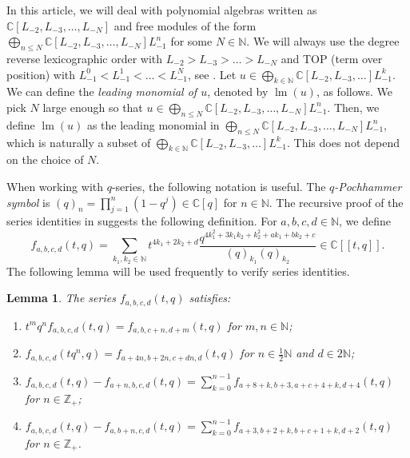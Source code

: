 \documentclass[a4paper, 12pt, reqno]{amsart}
\newtheorem{lemma}[theorem]{Lemma}
\theoremstyle{remark}
\DeclareMathOperator{\lm}{lm}
\begin{document}
In this article, we will deal with polynomial algebras written as $\mathbb{C}[L_{-2}, L_{-3}, \dots, L_{-N}]$ and free modules of the form $\bigoplus_{n \le N}\mathbb{C}[L_{-2}, L_{-3}, \dots, L_{-N}]L_{-1}^n$ for some $N \in \mathbb{N}$.
We will always use the degree reverse lexicographic order with $L_{-2} > L_{-3} > \dots > L_{-N}$ and TOP (term over position) with $L_{-1}^0 < L_{-1}^1 < \dots < L_{-1}^N$, see \cite[\S3.5]{adams_introduction_1994}.
Let $u \in \bigoplus_{k \in \mathbb{N}}\mathbb{C}[L_{-2}, L_{-3}, \dots]L_{-1}^k$.
We can define the \emph{leading monomial of $u$}, denoted by $\lm(u)$, as follows.
We pick $N$ large enough so that $u \in \bigoplus_{n \le N}\mathbb{C}[L_{-2}, L_{-3}, \dots, L_{-N}]L_{-1}^n$.
Then, we define $\lm(u)$ as the leading monomial in $\bigoplus_{n \le N}\mathbb{C}[L_{-2}, L_{-3}, \dots, L_{-N}]L_{-1}^n$, which is naturally a subset of $\bigoplus_{k \in \mathbb{N}}\mathbb{C}[L_{-2}, L_{-3}, \dots]L_{-1}^k$.
This does not depend on the choice of $N$.

When working with $q$-series, the following notation is useful.
The \emph{$q$-Pochhammer symbol} is $(q)_n = \prod_{j = 1}^n(1 - q^j) \in \mathbb{C}[q]$ for $n \in \mathbb{N}$.
The recursive proof of the series identities in \cite{andrews_singular_2022} suggests the following definition.
For $a, b, c, d \in \mathbb{N}$, we define
\begin{equation*}
  f_{a, b, c, d}(t, q) = \sum_{k_1, k_2 \in \mathbb{N}}t^{4k_1 + 2k_2 + d}\frac{q^{4k_1^2 + 3k_1k_2 + k_2^2 + ak_1 + bk_2 + c}}{(q)_{k_1}(q)_{k_2}} \in \mathbb{C}[[t, q]].
\end{equation*}
The following lemma will be used frequently to verify series identities.

\begin{lemma}
  \label{lmm:1}
  The series $f_{a, b, c, d}(t, q)$ satisfies:
  \begin{enumerate}
  \item $t^mq^nf_{a, b, c, d}(t, q) = f_{a, b, c + n, d + m}(t, q)$ for $m, n \in \mathbb{N}$;
  \item $f_{a, b, c, d}(tq^n, q) = f_{a + 4n, b + 2n, c + dn, d}(t, q)$ for $n \in \frac{1}{2}\mathbb{N}$ and $d \in 2\mathbb{N}$;
  \item $f_{a, b, c, d}(t, q) - f_{a + n, b, c, d}(t, q) = \sum_{k = 0}^{n - 1}f_{a + 8 + k, b + 3, a + c + 4 + k, d + 4}(t, q)$ for $n \in \mathbb{Z}_+$;
  \item $f_{a, b, c, d}(t, q) - f_{a, b + n, c, d}(t, q) = \sum_{k = 0}^{n - 1}f_{a + 3, b + 2 + k, b + c + 1 + k, d + 2}(t, q)$ for $n \in \mathbb{Z}_+$.
  \end{enumerate}
\end{lemma}
\end{document}
